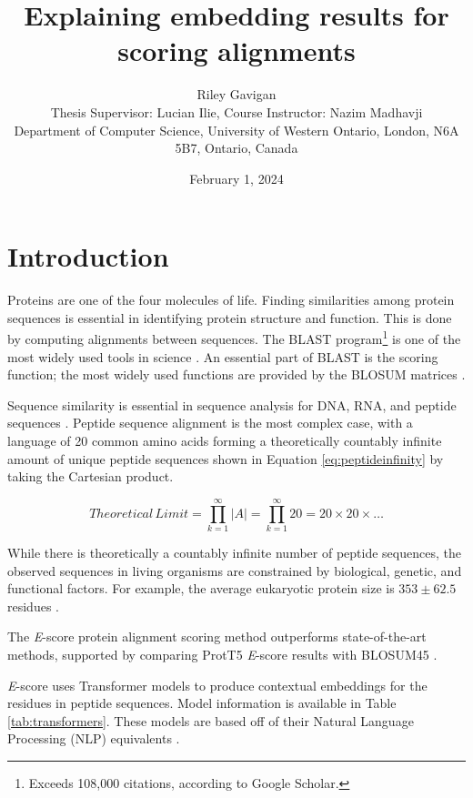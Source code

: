 \documentclass[
	letterpaper, %
	10pt, %
]{journalArticle}
\title{Explaining embedding results for scoring alignments}
\author{
	Riley Gavigan\\\normalsize{Thesis Supervisor: Lucian Ilie, Course Instructor: Nazim Madhavji}\\\footnotesize{Department of Computer Science, University of Western Ontario, London, N6A 5B7, Ontario, Canada}
}
\date{February 1, 2024\\}
\begin{document}
\maketitle %
\section{Introduction}
Proteins are one of the four molecules of life. Finding similarities among protein sequences is essential in identifying protein structure and function. This is done by computing alignments between sequences. The BLAST program\footnote{Exceeds 108,000 citations, according to Google Scholar.} is one of the most widely used tools in science \autocite{Atschul:1990}. An essential part of BLAST is the scoring function; the most widely used functions are provided by the BLOSUM matrices \autocite{Henikoff:1992}.

Sequence similarity is essential in sequence analysis for DNA, RNA, and peptide sequences \autocite{Ofer:2021}. Peptide sequence alignment is the most complex case, with a language of 20 common amino acids forming a theoretically countably infinite amount of unique peptide sequences shown in Equation \ref{eq:peptideinfinity} by taking the Cartesian product.

\begin{equation}
    {Theoretical\, Limit} = \prod_{k=1}^{\infty} |A| = \prod_{k=1}^{\infty} 20 = 20 \times 20 \times \ldots
    \label{eq:peptideinfinity}
\end{equation}

While there is theoretically a countably infinite number of peptide sequences, the observed sequences in living organisms are constrained by biological, genetic, and functional factors. For example, the average eukaryotic protein size is \(353 \pm 62.5\) residues \autocite{Nevers:2023}.

The \textit{E}-score protein alignment scoring method \autocite{Ashrafzadeh:2023} outperforms state-of-the-art methods, supported by comparing ProtT5 \autocite{Elnaggar:2021} \textit{E}-score results with BLOSUM45 \autocite{Henikoff:1992,Ashrafzadeh:2023}.

\textit{E}-score uses Transformer models to produce contextual embeddings for the residues in peptide sequences. Model information is available in Table \ref{tab:transformers}. These models are based off of their Natural Language Processing (NLP) equivalents \autocite{Raffel:2020, Devlin:2018, Zhenzhong:2020, Yang:2022, Rives:2021}.
\end{document}
